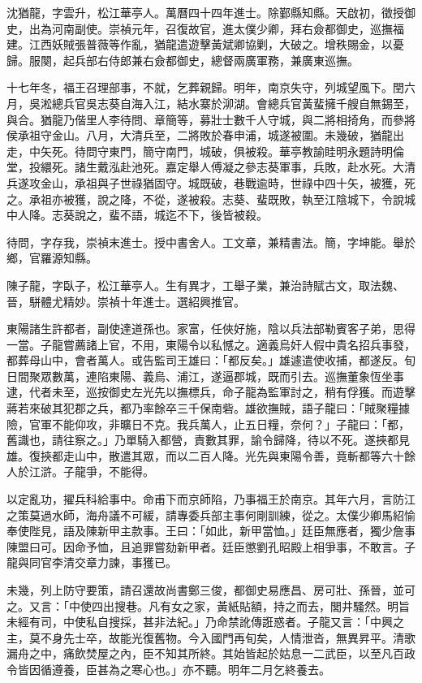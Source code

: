 \begin{pinyinscope}
{{沈猶龍，字雲升，松江華亭人。萬曆四十四年進士。除鄞縣知縣。天啟初，徵授御史，出為河南副使。崇禎元年，召復故官，進太僕少卿，拜右僉都御史，巡撫福建。江西妖賊張普薇等作亂，猶龍遣遊擊黃斌卿協剿，大破之。增秩賜金，以憂歸。服闋，起兵部右侍郎兼右僉都御史，總督兩廣軍務，兼廣東巡撫。

十七年冬，福王召理部事，不就，乞葬親歸。明年，南京失守，列城望風下。閏六月，吳淞總兵官吳志葵自海入江，結水寨於泖湖。會總兵官黃蜚擁千艘自無錫至，與合。猶龍乃偕里人李待問、章簡等，募壯士數千人守城，與二將相掎角，而參將侯承祖守金山。八月，大清兵至，二將敗於春申浦，城遂被圍。未幾破，猶龍出走，中矢死。待問守東門，簡守南門，城破，俱被殺。華亭教諭眭明永題詩明倫堂，投繯死。諸生戴泓赴池死。嘉定舉人傅凝之參志葵軍事，兵敗，赴水死。大清兵遂攻金山，承祖與子世祿猶固守。城既破，巷戰逾時，世祿中四十矢，被獲，死之。承祖亦被獲，說之降，不從，遂被殺。志葵、蜚既敗，執至江陰城下，令說城中人降。志葵說之，蜚不語，城迄不下，後皆被殺。

待問，字存我，崇禎末進士。授中書舍人。工文章，兼精書法。簡，字坤能。舉於鄉，官羅源知縣。

陳子龍，字臥子，松江華亭人。生有異才，工舉子業，兼治詩賦古文，取法魏、晉，駢體尤精妙。崇禎十年進士。選紹興推官。

東陽諸生許都者，副使達道孫也。家富，任俠好施，陰以兵法部勒賓客子弟，思得一當。子龍嘗薦諸上官，不用，東陽令以私憾之。適義烏奸人假中貴名招兵事發，都葬母山中，會者萬人。或告監司王雄曰：「都反矣。」雄遽遣使收捕，都遂反。旬日間聚眾數萬，連陷東陽、義烏、浦江，遂逼郡城，既而引去。巡撫董象恆坐事逮，代者未至，巡按御史左光先以撫標兵，命子龍為監軍討之，稍有俘獲。而遊擊蔣若來破其犯郡之兵，都乃率餘卒三千保南砦。雄欲撫賊，語子龍曰：「賊聚糧據險，官軍不能仰攻，非曠日不克。我兵萬人，止五日糧，奈何？」子龍曰：「都，舊識也，請往察之。」乃單騎入都營，責數其罪，諭令歸降，待以不死。遂挾都見雄。復挾都走山中，散遣其眾，而以二百人降。光先與東陽令善，竟斬都等六十餘人於江滸。子龍爭，不能得。

以定亂功，擢兵科給事中。命甫下而京師陷，乃事福王於南京。其年六月，言防江之策莫過水師，海舟議不可緩，請專委兵部主事何剛訓練，從之。太僕少卿馬紹愉奉使陛見，語及陳新甲主款事。王曰：「如此，新甲當恤。」廷臣無應者，獨少詹事陳盟曰可。因命予恤，且追罪嘗劾新甲者。廷臣懲劉孔昭殿上相爭事，不敢言。子龍與同官李清交章力諫，事獲已。

未幾，列上防守要策，請召還故尚書鄭三俊，都御史易應昌、房可壯、孫晉，並可之。又言：「中使四出搜巷。凡有女之家，黃紙貼額，持之而去，閭井騷然。明旨未經有司，中使私自搜採，甚非法紀。」乃命禁訛傳誑惑者。子龍又言：「中興之主，莫不身先士卒，故能光復舊物。今入國門再旬矣，人情泄沓，無異昇平。清歌漏舟之中，痛飲焚屋之內，臣不知其所終。其始皆起於姑息一二武臣，以至凡百政令皆因循遵養，臣甚為之寒心也。」亦不聽。明年二月乞終養去。

}}
\end{pinyinscope}
